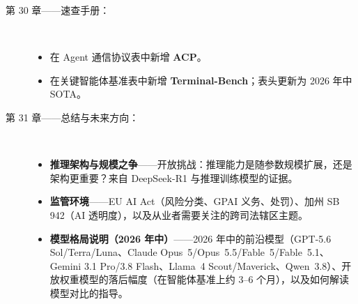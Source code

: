 \documentclass[11pt,a4paper,openany]{book}
\begin{document}
\begin{description}
  \item[第 30 章——速查手册：]~
    \begin{itemize}
      \item 在 Agent 通信协议表中新增 \textbf{ACP}。
      \item 在关键智能体基准表中新增 \textbf{Terminal-Bench}；表头更新为 2026 年中 SOTA。
    \end{itemize}

  \item[第 31 章——总结与未来方向：]~
    \begin{itemize}
      \item \textbf{推理架构与规模之争}——开放挑战：推理能力是随参数规模扩展，还是架构更重要？来自 DeepSeek-R1 与推理训练模型的证据。
      \item \textbf{监管环境}——EU AI Act（风险分类、GPAI 义务、处罚）、加州 SB 942（AI 透明度），以及从业者需要关注的跨司法辖区主题。
      \item \textbf{模型格局说明（2026 年中）}——2026 年中的前沿模型（GPT-5.6 Sol/Terra/Luna、Claude Opus~5/Opus~5.5/Fable~5/Fable~5.1、Gemini 3.1 Pro/3.8 Flash、Llama~4 Scout/Maverick、Qwen~3.8）、开放权重模型的落后幅度（在智能体基准上约 3--6 个月），以及如何解读模型对比的指导。
    \end{itemize}
\end{description}
\end{document}

